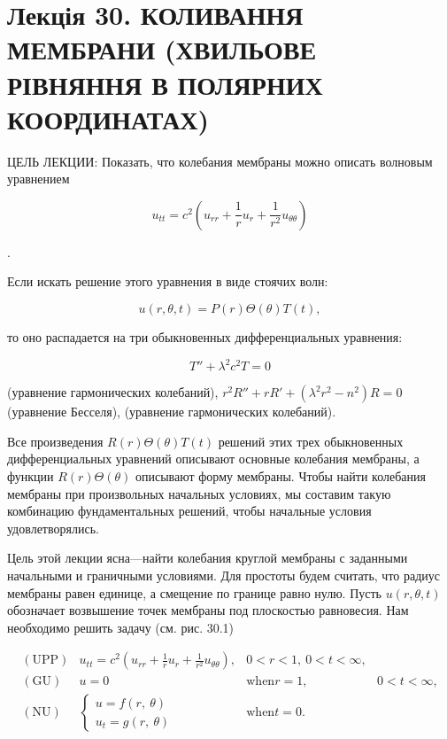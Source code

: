 \documentclass[
  ukrainian,
]{article}
\begin{document}
\section{Лекція 30. КОЛИВАННЯ МЕМБРАНИ (ХВИЛЬОВЕ РІВНЯННЯ В ПОЛЯРНИХ
КООРДИНАТАХ)}\label{ux43bux435ux43aux446ux456ux44f-30.-ux43aux43eux43bux438ux432ux430ux43dux43dux44f-ux43cux435ux43cux431ux440ux430ux43dux438-ux445ux432ux438ux43bux44cux43eux432ux435-ux440ux456ux432ux43dux44fux43dux43dux44f-ux432-ux43fux43eux43bux44fux440ux43dux438ux445-ux43aux43eux43eux440ux434ux438ux43dux430ux442ux430ux445}

ЦЕЛЬ ЛЕКЦИИ: Показать, что колебания мембраны можно описать волновым
уравнением

\[
u_{tt} = c^2 \left( u_{rr} + \frac{1}{r} u_r + \frac{1}{r^2} u_{\theta\theta} \right)
\]

.

Если искать решение этого уравнения в виде стоячих волн:

\[
u(r, \theta, t) = P(r) \Theta(\theta) T(t),
\]

то оно распадается на три обыкновенных дифференциальных уравнения:

\[
T'' + \lambda^2 c^2 T = 0
\]

(уравнение гармонических колебаний),
\(r^2 R'' + rR' + (\lambda^2 r^2 - n^2) R = 0\) (уравнение Бесселя),
(уравнение гармонических колебаний).

Все произведения \(R(r) \Theta(\theta) T(t)\) решений этих трех
обыкновенных дифференциальных уравнений описывают основные колебания
мембраны, а функции \(R(r) \Theta(\theta)\) описывают форму мембраны.
Чтобы найти колебания мембраны при произвольных начальных условиях, мы
составим такую комбинацию фундаментальных решений, чтобы начальные
условия удовлетворялись.

Цель этой лекции ясна---найти колебания круглой мембраны с заданными
начальными и граничными условиями. Для простоты будем считать, что
радиус мембраны равен единице, а смещение по границе равно нулю. Пусть
\(u\left(r,\theta,t\right)\) обозначает возвышение точек мембраны под
плоскостью равновесия. Нам необходимо решить задачу (см. рис. 30.1)

\[
\begin{array}{lll} (\text{UPP}) & u_{tt} = c^2 \left( u_{rr} + \frac{1}{r} u_r + \frac{1}{r^2} u_{\theta\theta} \right), & 0 < r < 1, \ 0 <t < \infty, \\ (\text{GU}) & u = 0 & \text{when} r = 1, & 0 < t < \infty, \\ (\text{NU}) & \begin{cases} u = f(r, \ \theta) \\ u_t = g(r, \ \theta) \end{cases} & \text{when} t = 0. \end{array}
\]
\end{document}
